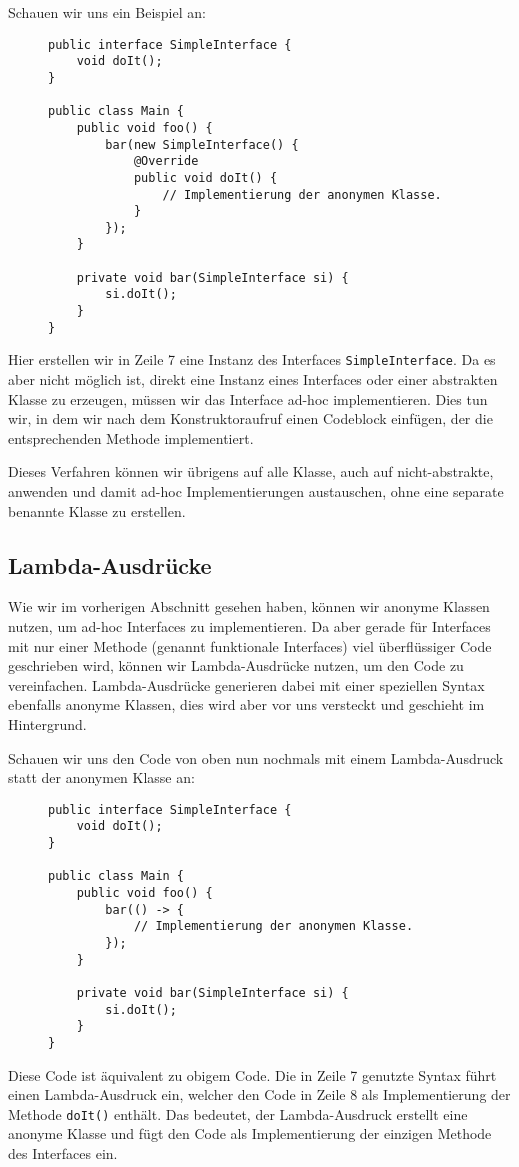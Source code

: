		Schauen wir uns ein Beispiel an:
		\begin{figure}[H]
			\centering
			\begin{lstlisting}
public interface SimpleInterface {
	void doIt();
}

public class Main {
	public void foo() {
		bar(new SimpleInterface() {
			@Override
			public void doIt() {
				// Implementierung der anonymen Klasse.
			}
		});
	}

	private void bar(SimpleInterface si) {
		si.doIt();
	}
}
\end{lstlisting}
		\end{figure}
		Hier erstellen wir in Zeile 7 eine Instanz des Interfaces \lstinline|SimpleInterface|. Da es aber nicht möglich ist, direkt eine Instanz eines Interfaces oder einer abstrakten Klasse zu erzeugen, müssen wir das Interface ad-hoc implementieren. Dies tun wir, in dem wir nach dem Konstruktoraufruf einen Codeblock einfügen, der die entsprechenden Methode implementiert.
		
		Dieses Verfahren können wir übrigens auf alle Klasse, auch auf nicht-abstrakte, anwenden und damit ad-hoc Implementierungen austauschen, ohne eine separate benannte Klasse zu erstellen.

\subsection{Lambda-Ausdrücke}
	\label{sec:lambda}

	Wie wir im vorherigen Abschnitt gesehen haben, können wir anonyme Klassen nutzen, um ad-hoc Interfaces zu implementieren. Da aber gerade für Interfaces mit nur einer Methode (genannt funktionale Interfaces) viel überflüssiger Code geschrieben wird, können wir Lambda-Ausdrücke nutzen, um den Code zu vereinfachen. Lambda-Ausdrücke generieren dabei mit einer speziellen Syntax ebenfalls anonyme Klassen, dies wird aber vor uns versteckt und geschieht im Hintergrund.
	
	Schauen wir uns den Code von oben nun nochmals mit einem Lambda-Ausdruck statt der anonymen Klasse an:
	\begin{figure}[H]
		\centering
		\begin{lstlisting}
public interface SimpleInterface {
	void doIt();
}

public class Main {
	public void foo() {
		bar(() -> {
			// Implementierung der anonymen Klasse.
		});
	}

	private void bar(SimpleInterface si) {
		si.doIt();
	}
}
\end{lstlisting}
	\end{figure}
	Diese Code ist äquivalent zu obigem Code. Die in Zeile 7 genutzte Syntax führt einen Lambda-Ausdruck ein, welcher den Code in Zeile 8 als Implementierung der Methode \lstinline|doIt()| enthält. Das bedeutet, der Lambda-Ausdruck erstellt eine anonyme Klasse und fügt den Code als Implementierung der einzigen Methode des Interfaces ein.
	
